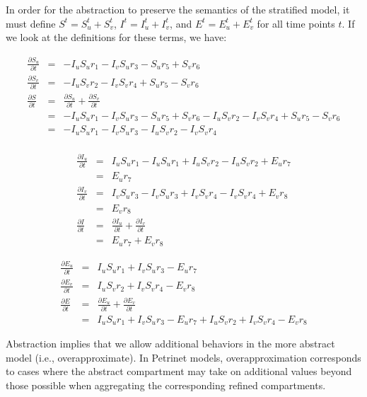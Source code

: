 In order for the abstraction to preserve the semantics of the stratified model, it must define $S^t = S_u^t + S_v^t$, $I^t = I_u^t + I_v^t$, and $E^t = E_u^t + E_v^t$ for all time points $t$.  If we look at the definitions for these terms, we have:

\begin{eqnarray*}
    \frac{\partial S_u}{\partial t} &=& - I_u S_u r_1 - I_v S_u r_3 - S_u r_5 + S_v r_6\\
    \frac{\partial S_v}{\partial t} &=& - I_u S_v r_2 - I_v S_v r_4 + S_u r_5 - S_v r_6\\ 
    \frac{\partial S}{\partial t} &=& \frac{\partial S_u}{\partial t}  + \frac{\partial S_v}{\partial t} \\
    &=& - I_u S_u r_1 - I_v S_u r_3 - S_u r_5 + S_v r_6 - I_u S_v r_2 - I_v S_v r_4 + S_u r_5 - S_v r_6\\
    &=& - I_u S_u r_1 - I_v S_u r_3 - I_u S_v r_2 - I_v S_v r_4 \\
\end{eqnarray*}

\begin{eqnarray*}
    \frac{\partial I_u}{\partial t} &=& I_u S_u r_1 - I_u S_u r_1 + I_u S_v r_2 - I_u S_v r_2 + E_u r_7\\
    &=&  E_u r_7\\
    \frac{\partial I_v}{\partial t} &=& I_v S_u r_3 - I_v S_u r_3 + I_v S_v r_4 - I_v S_v r_4 + E_v r_8\\ 
    &=& E_v r_8\\ 
    \frac{\partial I}{\partial t} &=& \frac{\partial I_u}{\partial t}  + \frac{\partial I_v}{\partial t} \\
    &=& E_u r_7 + E_v r_8
\end{eqnarray*}

\begin{eqnarray*}
    \frac{\partial E_u}{\partial t} &=& I_u S_u r_1 + I_v S_u r_3 - E_u r_7\\
    \frac{\partial E_v}{\partial t} &=& I_u S_v r_2 + I_v S_v r_4 - E_v r_8\\ 
    \frac{\partial E}{\partial t} &=& \frac{\partial E_u}{\partial t}  + \frac{\partial E_v}{\partial t} \\
    &=& I_u S_u r_1 + I_v S_u r_3 - E_u r_7 + I_u S_v r_2 + I_v S_v r_4 - E_v r_8
\end{eqnarray*}

Abstraction implies that we allow additional behaviors in the more abstract model (i.e., overapproximate).  In Petrinet models, overapproximation corresponds to cases where the abstract compartment may take on additional values beyond those possible when aggregating the corresponding refined compartments.



